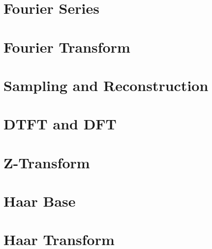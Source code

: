 
\makeindex



    

    \tableofcontents

    \chapter{Fourier Series}
	\label{ch:fs}

	
	
	
	
	
	
  

    \chapter{Fourier Transform}
    \label{ch:ft}
    
    
    
    
    
    
    
    
    

    \chapter{Sampling and Reconstruction}
    \label{ch:sr}
    
    
    
    
    
    
 
	\chapter{DTFT and DFT}
    \label{ch:dft}
    
    
	
	\chapter{Z-Transform}
    \label{ch:zt}

	\chapter{Haar Base}
    \label{ch:hb}
    

    \chapter{Haar Transform}
    \label{ch:ht}

    
    


